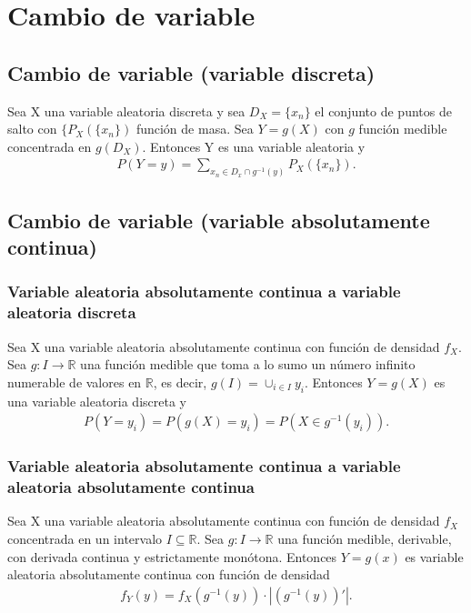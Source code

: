 \chapter{Cambio de variable}

\section{Cambio de variable (variable discreta)}

\begin{prop}
    Sea X una variable aleatoria discreta y sea $D_X = \{x_n\}$ el conjunto de puntos de salto con $\{P_X(\{x_n\})$ función de masa. Sea $Y = g(X)$ con $g$ función medible concentrada en $g(D_X)$. Entonces Y es una variable aleatoria y
    \begin{align*}
        P(Y = y) = \sum_{x_n \in D_x \cap g^{-1}(y)}{P_X(\{x_n\})}.
    \end{align*}
\end{prop}

\section{Cambio de variable (variable absolutamente continua)}
\subsection{Variable aleatoria absolutamente continua a variable aleatoria discreta}

\begin{prop}
    Sea X una variable aleatoria absolutamente continua con función de densidad $f_X$. Sea $g: I \longrightarrow \mathbb{R}$ una función medible que toma a lo sumo un número infinito numerable de valores en $\mathbb{R}$, es decir, $g(I) = \cup_{i \in I}{y_i}$. Entonces $Y = g(X)$ es una variable aleatoria discreta y
    \begin{align*}
        P(Y = y_i) = P(g(X) = y_i) = P(X \in g^{-1}(y_i)).
    \end{align*}
\end{prop}

\subsection{Variable aleatoria absolutamente continua a variable aleatoria absolutamente continua}

\begin{teo}
    Sea X una variable aleatoria absolutamente continua con función de densidad $f_X$ concentrada en un intervalo $I \subseteq \mathbb{R}$. Sea $g: I \longrightarrow \mathbb{R}$ una función medible, derivable, con derivada continua y estrictamente monótona. Entonces $Y = g(x)$ es variable aleatoria absolutamente continua con función de densidad
    \begin{align*}
        f_Y(y) = f_X(g^{-1}(y)) \cdot |(g^{-1}(y))'|.
    \end{align*}
\end{teo}

